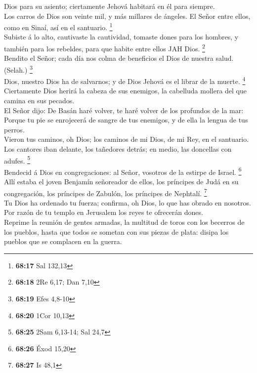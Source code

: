 Dios para su asiento; ciertamente Jehová habitará en él para siempre.\\
 Los carros de Dios son veinte mil, y más millares de
ángeles. El Señor entre ellos, como en Sinaí, así en el santuario.
\footnote{\textbf{68:17} Sal 132,13}\\
 Subiste á lo alto, cautivaste la cautividad, tomaste
dones para los hombres, y también para los rebeldes, para que habite
entre ellos JAH Dios. \footnote{\textbf{68:18} 2Re 6,17; Dan 7,10}\\
 Bendito el Señor; cada día nos colma de beneficios el
Dios de nuestra salud. (Selah.) \footnote{\textbf{68:19} Efes 4,8-10}\\
 Dios, nuestro Dios ha de salvarnos; y de Dios Jehová es
el librar de la muerte. \footnote{\textbf{68:20} 1Cor 10,13}\\
 Ciertamente Dios herirá la cabeza de sus enemigos, la
cabelluda mollera del que camina en sus pecados.\\
 El Señor dijo: De Basán haré volver, te haré volver de
los profundos de la mar:\\
 Porque tu pie se enrojecerá de sangre de tus enemigos, y
de ella la lengua de tus perros.\\
 Vieron tus caminos, oh Dios; los caminos de mi Dios, de
mi Rey, en el santuario.\\
 Los cantores iban delante, los tañedores detrás; en
medio, las doncellas con adufes. \footnote{\textbf{68:25} 2Sam 6,13-14;
  Sal 24,7}\\
 Bendecid á Dios en congregaciones: al Señor, vosotros de
la estirpe de Israel. \footnote{\textbf{68:26} Éxod 15,20}\\
 Allí estaba el joven Benjamín señoreador de ellos, los
príncipes de Judá en su congregación, los príncipes de Zabulón, los
príncipes de Nephtalí. \footnote{\textbf{68:27} Is 48,1}\\
 Tu Dios ha ordenado tu fuerza; confirma, oh Dios, lo que
has obrado en nosotros.\\
 Por razón de tu templo en Jerusalem los reyes te
ofrecerán dones.\\
 Reprime la reunión de gentes armadas, la multitud de
toros con los becerros de los pueblos, hasta que todos se sometan con
sus piezas de plata: disipa los pueblos que se complacen en la guerra.\\
